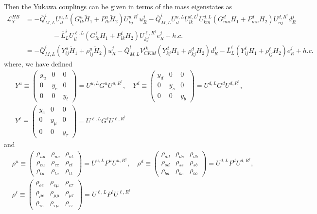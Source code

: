 \documentclass[12pt]{article}
\begin{document}
Then the Yukawa couplings can be given in terms of the mass eigenstates as
\begin{align}
\mathcal{L}_{Y}^{HB} &= -\bar{Q}_{M,L}^{i}U_{il}^{u,L}(G_{lk}^{u}\tilde{H}_{1}+P_{lk}^{u}\tilde{H}_{2})U_{kj}^{u,R^{\dagger}}u_{R}^{j}-\bar{Q}_{M,L}^{i}U_{il}^{u,L}U_{lk}^{d,L^{\dagger}}U_{km}^{d,L}(G_{mn}^{d}H_{1}+P_{mn}^{d}H_{2})U_{nj}^{d,R^{\dagger}}d_{R}^{j} \nonumber \\
&\qquad\qquad  - \bar{L}_{L}^{i}U_{il}^{\ell,L}(G_{lk}^{\ell}H_{1}+P_{lk}^{\ell}H_{2})U_{kj}^{\ell,R^{\dagger}}e_{R}^{j} + h.c.\nonumber \\
&=-\bar{Q}_{M,L}^{i}(Y_{ij}^{u}\tilde{H}_{1}+\rho_{ij}^{u}\tilde{H}_{2})u_{R}^{j} - \bar{Q}_{M,L}^{i}V_{CKM}^{ik}(Y_{kj}^{d}H_{1}+\rho_{kj}^{d}H_{2})d_{R}^{j}- \bar{L}_{L}^{i}(Y_{ij}^{\ell}H_{1}+\rho_{ij}^{\ell}H_{2})e_{R}^{j} + h.c.
\end{align}
where, we have defined
\begin{align}
&Y^{u} \equiv \begin{pmatrix}
y_{u} & 0 & 0 \\
0 & y_{c} & 0 \\
0 & 0 & y_{t}
\end{pmatrix} = U^{u,L}G^{u}U^{u,R^{\dagger}},\quad Y^{d}\equiv \begin{pmatrix}
y_{d} & 0 & 0 \\
0 & y_{s} & 0 \\
0 & 0 & y_{b}
\end{pmatrix} = U^{d,L}G^{d}U^{d,R^{\dagger}},\nonumber \\
&Y^{\ell}\equiv \begin{pmatrix}
y_{e} & 0 & 0 \\
0 & y_{\mu} & 0 \\
0 & 0 & y_{\tau}
\end{pmatrix} = U^{\ell,L}G^{\ell}U^{\ell,R^{\dagger}}
\end{align}
and
\begin{align}
&\rho^{u} \equiv \begin{pmatrix}
\rho_{uu} & \rho_{uc} & \rho_{ut} \\
\rho_{cu} & \rho_{cc} & \rho_{ct} \\
\rho_{tu} & \rho_{tc} & \rho_{tt}
\end{pmatrix} = U^{u,L}P^{u}U^{u,R^{\dagger}},\quad \rho^{d}\equiv \begin{pmatrix}
\rho_{dd} & \rho_{ds} & \rho_{db} \\
\rho_{sd} & \rho_{ss} & \rho_{sb} \\
\rho_{bd} & \rho_{bs} & \rho_{bb}
\end{pmatrix} = U^{d,L}P^{d}U^{d,R^{\dagger}},\nonumber \\
&\rho^{\ell}\equiv \begin{pmatrix}
\rho_{ee} & \rho_{e\mu} & \rho_{e \tau} \\
\rho_{\mu e} & \rho_{\mu \mu} & \rho_{\mu \tau} \\
\rho_{\tau e} & \rho_{\tau \mu} & \rho_{\tau \tau}
\end{pmatrix} = U^{\ell,L}P^{\ell}U^{\ell,R^{\dagger}}
\end{align}
\end{document}
